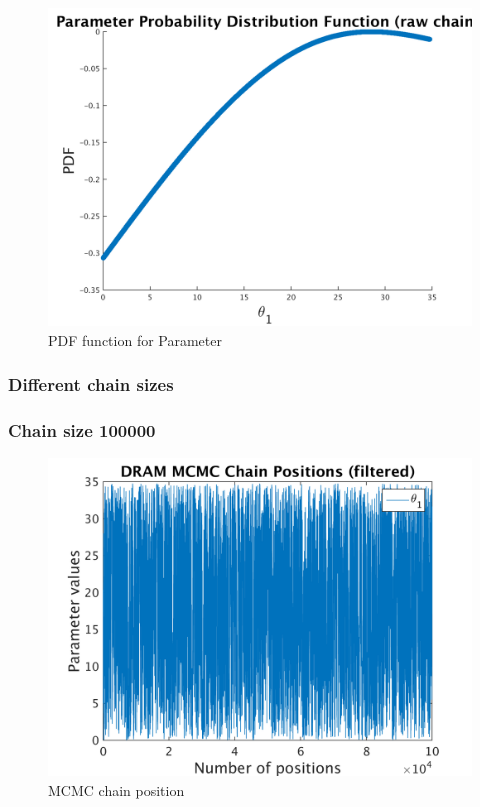 \begin{figure}[h!]
  
  \centering
   \includegraphics[scale=0.75]{output_1000/ip_logLike_unified}
   \caption{PDF function for Parameter }
\end{figure}


\subsubsection{Different chain sizes }
\subsubsection{Chain size 100000 }

\begin{figure}[h!]
  
  \centering
   \includegraphics[scale=0.75]{output_100000/simple_ip_chain_pos_filt}
   \caption{MCMC chain position }
\end{figure}


